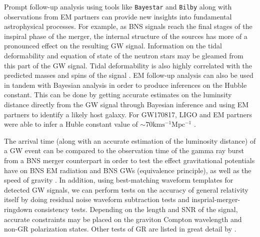 Prompt follow-up analysis using tools like \texttt{Bayestar} and 
\texttt{Bilby} along with observations from \ac{EM} partners can 
provide new insights into fundamental astrophysical processes. For 
example, as \ac{BNS} signals reach the final stages of the inspiral 
phase of the merger, the internal structure of the sources has more 
of a pronounced effect on the resulting \ac{GW} signal. 
Information on the tidal deformability and equation 
of state of the neutron stars may be gleamed from this part of the 
\ac{GW} signal. Tidal deformability is also highly correlated with the 
predicted masses and spins of the signal \cite{PhysRevLett.119.161101}. 
\ac{EM} follow-up analysis can also be used in tandem with Bayesian 
analysis in order to produce inferences on the Hubble constant. This can 
be done by getting accurate estimates on the luminsity distance directly 
from the \ac{GW} signal through Bayesian inference and using \ac{EM} 
partners to identify a likely host galaxy. For GW170817, \ac{LIGO} 
and \ac{EM} partners were able to infer a Huble constant value 
of $\sim 70 \mathrm{km s^{-1} Mpc^{-1}}$ \cite{PhysRevLett.119.161101}. 
 
%
%
The arrival time (along with an accurate 
estimation of the luminosity distance) of a \ac{GW} event 
can be compared to the observation time of the gamma ray burst from a 
\ac{BNS} merger counterpart in order to test the effect gravitational 
potentials have on \ac{BNS} \ac{EM} radiation and \ac{BNS} \ac{GW}s 
(equivalence principle), as well as the speed of 
gravity \cite{2017arXiv171005834L}. In addition, using best-matching 
waveform templates for detected \ac{GW} signals, we can perform 
tests on the accuracy of general relativity itself by doing residual 
noise waveform subtraction tests and insprial-merger-ringdown consistency 
tests. Depending on the length and \ac{SNR} of the signal, accurate 
constraints may be placed on the graviton Compton wavelength and 
non-\ac{GR} polarization states. Other tests of \ac{GR} are 
listed in great detail by \cite{PhysRevLett.116.221101}.


%
%

